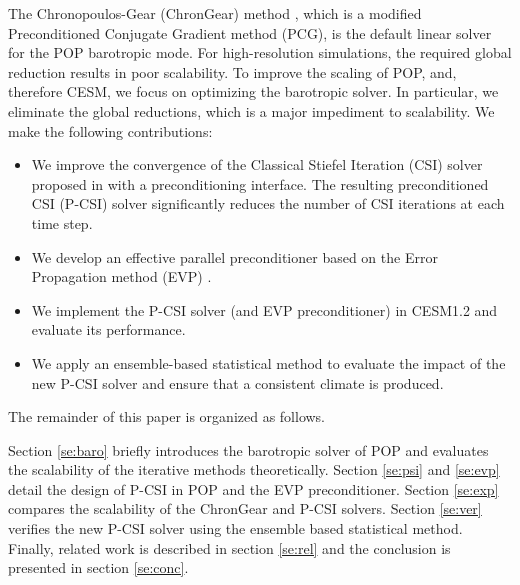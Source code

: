 The Chronopoulos-Gear (ChronGear) method \cite{dAzevedo1999lapack},
which is a modified Preconditioned Conjugate Gradient method (PCG),  is
the default linear solver for the POP barotropic mode.  For
high-resolution simulations, the required global reduction results in
poor scalability. To improve the scaling of POP, and, therefore CESM, 
we focus on optimizing the barotropic solver.  In particular, we
eliminate the global reductions, which is a major impediment to 
scalability.  We make the following contributions:





\begin{itemize}
\item We improve the convergence of the Classical Stiefel Iteration 
(CSI) solver proposed in \cite{hu2013scalable} with a preconditioning interface.
The resulting preconditioned CSI (P-CSI) solver significantly reduces
 the number of CSI iterations at each time step.
\item We develop an effective parallel preconditioner based on the
Error Propagation method (EVP) \cite{roache1995elliptic}.
\item
We implement the P-CSI solver (and EVP preconditioner)  in CESM1.2 and evaluate its performance.
\item
We apply an ensemble-based statistical method to evaluate the impact
of the new P-CSI solver and ensure that a consistent climate is produced.
\end{itemize}


 The remainder of this paper is organized as follows.

 Section \ref{se:baro} briefly introduces the barotropic solver of POP
 and evaluates the scalability of the iterative methods
 theoretically. %
 Section \ref{se:psi} and \ref{se:evp} detail the design of P-CSI in
 POP and the EVP preconditioner.  Section \ref{se:exp} compares the
 scalability of the ChronGear and P-CSI solvers.  Section \ref{se:ver}
 verifies the new P-CSI solver using the ensemble based statistical
 method.  Finally, related work is described in section \ref{se:rel}
 and the conclusion is presented in section \ref{se:conc}.



